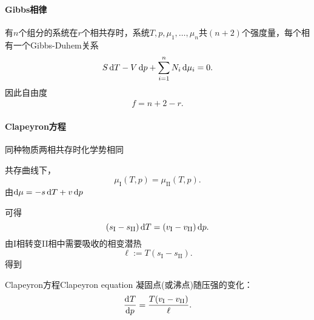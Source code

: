 \paragraph{Gibbs相律}有$n$个组分的系统在$r$个相共存时，系统$T,p,\mu_1,\ldots,\mu_n$共$(n+2)$个强度量，每个相有一个Gibbs-Duhem关系
\[
	S\mathop{}\!\mathrm{d} T-V\mathop{}\!\mathrm{d} p+\sum_{i=1}^nN_i\mathop{}\!\mathrm{d}\mu_i=0.
\]
因此自由度
\begin{align}
	f=n+2-r.
\end{align}
\paragraph{Clapeyron方程}
同种物质两相共存时化学势相同
\begin{center}
\end{center}
共存曲线下，
\[
	\mu_\mathrm I(T,p)=\mu_\mathrm{II}(T,p).
\]
由$\mathop{}\!\mathrm{d}\mu=-s\mathop{}\!\mathrm{d} T+v\mathop{}\!\mathrm{d} p$
\iffalse
	故
	\[
		\pv{\mu_\mathrm I}T\d T+\pv{\mu_\mathrm I}p\d p=\pv{\mu_\mathrm{II}}T\d T+\pv{\mu_\mathrm{II}}p\d p.
	\]
	由Gibbs自由能给出Maxwell关系
	\begin{align*}
		\pw GTN=\pw GNT & \implies\kh{\pv\mu{T}}_N=-\kh{\pv SN}_T=-s, \\
		\pw GpN=\pw GNp & \implies\kh{\pv\mu{p}}_N=\kh{\pv VN}_p=v.
	\end{align*}
\fi
可得
\[
	\left(s_\mathrm I-s_\mathrm{II}\right)\mathop{}\!\mathrm{d} T=\left(v_\mathrm I-v_\mathrm{II}\right)\mathop{}\!\mathrm{d} p.
\]
由I相转变II相中需要吸收的相变潜热
\[
	\ell:=T(s_\mathrm I-s_\mathrm{II}).
\]
得到\begin{theorem}{Clapeyron方程}{Clapeyron equation}
	凝固点(或沸点)随压强的变化：
	\begin{equation}
		\frac{\mathrm{d}^{{}}T}{\mathrm{d}{p}^{{}}}=\frac{T(v_\mathrm I-v_\mathrm{II})}\ell.
	\end{equation}
\end{theorem}
